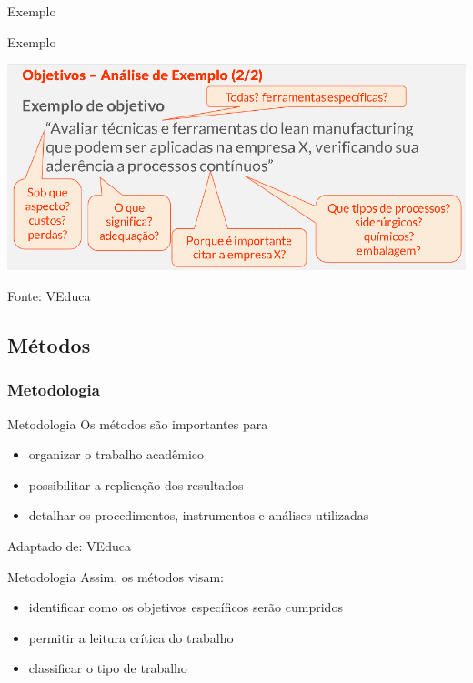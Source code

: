 \documentclass{beamer}
\begin{document}

\begin{frame}{Exemplo}
  \begin{exampleblock}{Exemplo}
    \begin{center}
      \includegraphics[width=\textwidth]{EstruturaI/objetivo-verbos}
    \end{center}
  \end{exampleblock}

  \vfill
  \scriptsize
  Fonte: VEduca
\end{frame}

\subsection{Métodos}

\subsubsection{Metodologia}

\begin{frame}{Metodologia}
  \footnotesize
  Os métodos são importantes para
  \bigskip
  \begin{itemize}
    \footnotesize
  \item organizar o trabalho acadêmico
    \bigskip
  \item possibilitar a replicação dos resultados
    \bigskip
  \item detalhar os procedimentos, instrumentos e análises utilizadas
  \end{itemize}

  \vfill
  \scriptsize
  Adaptado de: VEduca
\end{frame}

\begin{frame}{Metodologia}
  \footnotesize
  Assim, os métodos visam:
  \bigskip
  \begin{itemize}
    \footnotesize
  \item identificar como os objetivos específicos serão cumpridos
    \bigskip
  \item permitir a leitura crítica do trabalho
    \bigskip
  \item classificar o tipo de trabalho
  \end{itemize}
\end{frame}
\end{document}
